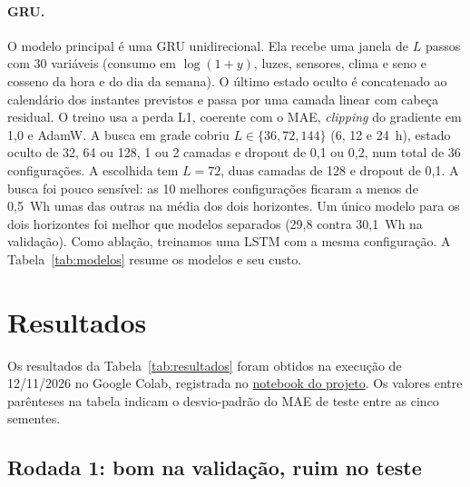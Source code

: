 \documentclass[11pt,a4paper]{article}
\begin{document}
\paragraph{GRU.} O modelo principal é uma GRU \citep{cho2014} unidirecional. Ela recebe uma janela de $L$ passos com 30 variáveis (consumo em $\log(1+y)$, luzes, sensores, clima e seno e cosseno da hora e do dia da semana). O último estado oculto é concatenado ao calendário dos instantes previstos e passa por uma camada linear com cabeça residual. O treino usa a perda L1, coerente com o MAE, \emph{clipping} do gradiente em 1,0 e AdamW. A busca em grade cobriu $L \in \{36, 72, 144\}$ (6, 12 e 24~h), estado oculto de 32, 64 ou 128, 1 ou 2 camadas e dropout de 0,1 ou 0,2, num total de 36 configurações. A escolhida tem $L=72$, duas camadas de 128 e dropout de 0,1. A busca foi pouco sensível: as 10 melhores configurações ficaram a menos de 0,5~Wh umas das outras na média dos dois horizontes. Um único modelo para os dois horizontes foi melhor que modelos separados (29,8 contra 30,1~Wh na validação). Como ablação, treinamos uma LSTM \citep{hochreiter1997} com a mesma configuração. A Tabela~\ref{tab:modelos} resume os modelos e seu custo.

\begin{table}[!htbp]
  \centering\small
  \setlength{\tabcolsep}{3pt}
  \renewcommand{\arraystretch}{1.12}
  \caption{Configurações finais e custo computacional (média de 5 sementes; GRU e LSTM em GPU, as demais redes em CPU). Inferência: uma passagem pelas 2\,983 origens do teste.}
  \label{tab:modelos}
  
\end{table}

\section{Resultados}

Os resultados da Tabela~\ref{tab:resultados} foram obtidos na execução de 12/11/2026 no Google Colab, registrada no \href{https://github.com/iantextbar/previsao_curto_prazo_consumo_energia_eletrica_MAE5920/blob/96d6e47/src/notebooks/previsao_curto_prazo_consumo_energia_eletrica.ipynb}{notebook do projeto}. Os valores entre parênteses na tabela indicam o desvio-padrão do MAE de teste entre as cinco sementes.

\subsection{Rodada 1: bom na validação, ruim no teste}\label{sec:r1}
\end{document}
